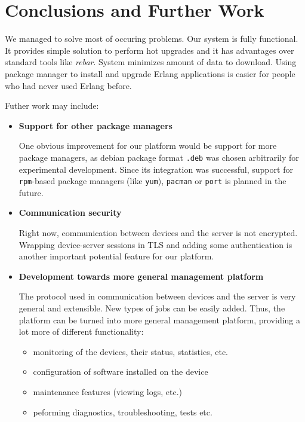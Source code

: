 \section{Conclusions and Further Work}

We managed to solve most of occuring problems. Our system is fully functional. It provides simple solution to perform hot upgrades and it has advantages over standard tools like \emph{rebar}. System minimizes amount of data to download. Using package manager to install and upgrade Erlang applications is easier for people who had never used Erlang before.

\noindent Futher work may include:
\begin{itemize}
\item \textbf{Support for other package managers}

One obvious improvement for our platform would be support for more package managers, as
debian package format {\tt .deb} was chosen arbitrarily for experimental development.
Since its integration was successful, support for {\tt rpm}-based package managers (like {\tt yum}),
{\tt pacman} or {\tt port} is planned in the future.

\item \textbf{Communication security}

Right now, communication between devices and the server is not encrypted. Wrapping device-server
sessions in TLS and adding some authentication is another important potential feature for our
platform.

\item \textbf{Development towards more general management platform}

The protocol used in communication between devices and the server is very general
and extensible. New types of jobs can be easily added. Thus, the platform can be turned into
more general management platform, providing a lot more of different functionality:

\begin{itemize}
\item monitoring of the devices, their status, statistics, etc.
\item configuration of software installed on the device
\item maintenance features (viewing logs, etc.)
\item peforming diagnostics, troubleshooting, tests etc.
\end{itemize}

\end{itemize}

